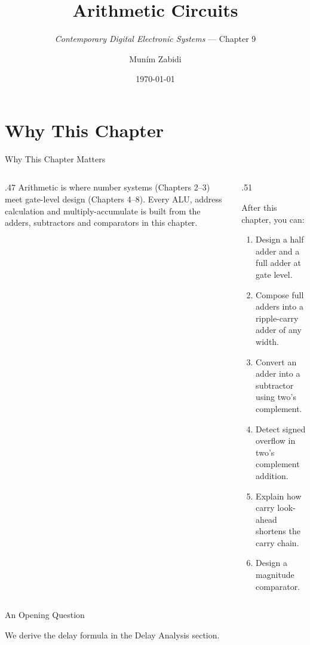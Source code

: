 \documentclass[9pt,aspectratio=169,xcolor=table]{beamer}
\title{Arithmetic Circuits}
\subtitle{\emph{Contemporary Digital Electronic Systems} --- Chapter 9}
\author{Mun\'{i}m Zabidi}
\institute{\color{primary}Faculty of Electrical Engineering, Universiti Teknologi Malaysia}
\date{\today}
\begin{document}
\titlepage

\section{Why This Chapter}

\begin{frame}{Why This Chapter Matters}
  \begin{columns}[c]
  \begin{column}{.47\textwidth}
    Arithmetic is where number systems (Chapters 2--3) meet gate-level design (Chapters 4--8). Every ALU, address calculation and multiply-accumulate is built from the adders, subtractors and comparators in this chapter.
  \end{column}
  \begin{column}{.51\textwidth}
    \begin{block}{After this chapter, you can:}
    {\small
    \begin{enumerate}\itemsep2pt
      \item Design a half adder and a full adder at gate level.
      \item Compose full adders into a ripple-carry adder of any width.
      \item Convert an adder into a subtractor using two's complement.
      \item Detect signed overflow in two's complement addition.
      \item Explain how carry look-ahead shortens the carry chain.
      \item Design a magnitude comparator.
    \end{enumerate}}
    \end{block}
  \end{column}
  \end{columns}
\end{frame}

\begin{frame}{An Opening Question}
  \leavevmode\vspace{4mm}
  \begin{center}
  \end{center}
  \vspace{4mm}
  We derive the delay formula in the Delay Analysis section.
\end{frame}
\end{document}
